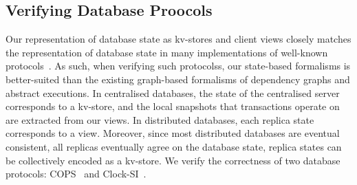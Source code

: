 \vspace*{-7pt}
\subsection{Verifying Database Proocols}
\vspace*{-7pt}
\label{sec:verify-impl}
%
Our representation of database state as kv-stores and client views closely matches the representation of database state in many implementations of 
well-known protocols~\cite{ramp,rola,cops,wren,redblue,PSI,NMSI,gdur,clocksi,distrsi}.
As such, when verifying such protocolss, our state-based formalisms is better-suited than the existing graph-based formalisms of dependency graphs and abstract executions. 
In centralised databases, the state of the centralised server corresponds to a kv-store,
and the local snapshots that transactions operate on are extracted from our views.  
In distributed databases, each replica state corresponds to a view. 
Moreover, since most distributed databases are eventual consistent, 
\ie all replicas eventually agree on the database state,
replica states can be collectively encoded as a kv-store.
We verify the correctness of two database protocols:
COPS~\cite{cops} and Clock-SI~\cite{clocksi}.

